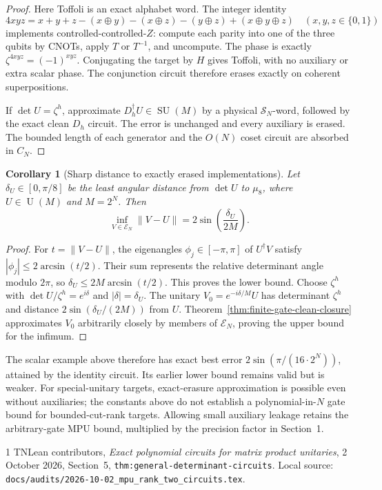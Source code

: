 \documentclass[11pt]{article}
\newtheorem{corollary}[theorem]{Corollary}
\begin{document}
\begin{proof}
Here Toffoli is an exact alphabet word. The integer identity
\[
 4xyz=x+y+z-(x\mathbin\oplus y)-(x\mathbin\oplus z)
       -(y\mathbin\oplus z)+(x\mathbin\oplus y\mathbin\oplus z)
 \quad(x,y,z\in\{0,1\})
\]
implements controlled-controlled-$Z$: compute each parity into one of the
three qubits by CNOTs, apply $T$ or $T^{-1}$, and uncompute. The phase is
exactly $\zeta^{4xyz}=(-1)^{xyz}$. Conjugating the target by $H$ gives
Toffoli, with no auxiliary or extra scalar phase. The conjunction circuit
therefore erases exactly on coherent superpositions.

If $\det U=\zeta^h$, approximate $D_h^\dagger U\in\operatorname{SU}(M)$
by a physical $\mathcal S_N$-word, followed by the exact clean $D_h$
circuit. The error is unchanged and every auxiliary is erased. The bounded
length of each generator and the $O(N)$ coset circuit are absorbed in $C_N$.
\end{proof}

\begin{corollary}[Sharp distance to exactly erased implementations]
\label{cor:finite-gate-clean-sharp-distance}
Let $\delta_U\in[0,\pi/8]$ be the least angular distance from $\det U$ to
$\mu_8$, where $U\in\operatorname{U}(M)$ and $M=2^N$. Then
\[
 \inf_{V\in\mathcal E_N}\|V-U\|
 =2\sin\left(\frac{\delta_U}{2M}\right).
\]
\end{corollary}

\begin{proof}
For $t=\|V-U\|$, the eigenangles $\phi_j\in[-\pi,\pi]$ of $U^\dagger V$
satisfy $|\phi_j|\leq2\arcsin(t/2)$. Their sum represents the relative
determinant angle modulo $2\pi$, so
$\delta_U\leq2M\arcsin(t/2)$. This proves the lower bound.
Choose $\zeta^h$ with $\det U/\zeta^h=e^{i\delta}$ and
$|\delta|=\delta_U$. The unitary $V_0=e^{-i\delta/M}U$ has determinant
$\zeta^h$ and distance $2\sin(\delta_U/(2M))$ from $U$.
Theorem~\ref{thm:finite-gate-clean-closure} approximates $V_0$ arbitrarily
closely by members of $\mathcal E_N$, proving the upper bound for the infimum.
\end{proof}

The scalar example above therefore has exact best error
$2\sin(\pi/(16\cdot2^N))$, attained by the identity circuit. Its earlier
lower bound remains valid but is weaker. For special-unitary targets,
exact-erasure approximation is possible even without auxiliaries; the
constants above do not establish a polynomial-in-$N$ gate bound for
bounded-cut-rank targets. Allowing small auxiliary leakage retains the arbitrary-gate MPU bound,
multiplied by the precision factor in Section~1.

\begin{thebibliography}{1}
TNLean contributors,
\emph{Exact polynomial circuits for matrix product unitaries},
2 October 2026, Section~5, \texttt{thm:general-determinant-circuits}.
Local source:
\nolinkurl{docs/audits/2026-10-02_mpu_rank_two_circuits.tex}.
\end{thebibliography}
\end{document}
